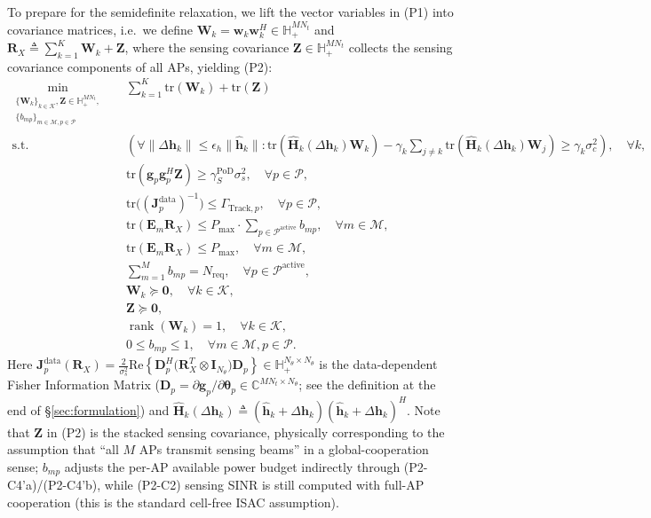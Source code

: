 \documentclass[12pt,a4paper]{article}
\newcommand{\vect}[1]{\mathbf{#1}}
\newcommand{\mat}[1]{\mathbf{#1}}
\newcommand{\tr}{\text{tr}}
\newcommand{\Real}{\text{Re}}
\DeclareMathOperator{\rank}{rank}
\begin{document}
To prepare for the semidefinite relaxation, we lift the vector variables in (P1) into covariance matrices, i.e.\ we define $\mat{W}_k = \vect{w}_k \vect{w}_k^H \in \mathbb{H}_+^{MN_t}$ and $\mat{R}_X \triangleq \sum_{k=1}^K \mat{W}_k + \mat{Z}$, where the sensing covariance $\mat{Z} \in \mathbb{H}_+^{MN_t}$ collects the sensing covariance components of all APs, yielding (P2):
\begin{align}
\min_{\substack{\{\mat{W}_k\}_{k\in\mathcal{K}}, \mat{Z} \in \mathbb{H}_+^{MN_t}, \\ \{b_{mp}\}_{m\in\mathcal{M},p\in\mathcal{P}}}} \quad
& \sum_{k=1}^K \tr(\mat{W}_k) + \tr(\mat{Z}) \tag{P2} \\
\text{s.t.} \quad
& (\forall \|\Delta\vect{h}_k\| \leq \epsilon_h \|\hat{\vect{h}}_k\|: \tr(\hat{\mat{H}}_k(\Delta\vect{h}_k) \mat{W}_k) - \gamma_k \sum_{j \neq k} \tr(\hat{\mat{H}}_k(\Delta\vect{h}_k) \mat{W}_j) \geq \gamma_k \sigma_c^2), \quad \forall k, \tag{P2-C1} \\
& \tr(\vect{g}_p \vect{g}_p^H \mat{Z}) \geq \gamma_S^{\text{PoD}} \sigma_s^2, \quad \forall p \in \mathcal{P}, \tag{P2-C2} \\
& \tr\big((\mat{J}_p^{\text{data}})^{-1}\big) \leq \Gamma_{\text{Track},p}, \quad \forall p \in \mathcal{P}, \tag{P2-C3} \label{eq:p2c3} \\
& \tr(\mat{E}_m \mat{R}_X) \leq P_{\max} \cdot \sum_{p \in \mathcal{P}^{\text{active}}} b_{mp}, \quad \forall m \in \mathcal{M}, \tag{P2-C4'a} \\
& \tr(\mat{E}_m \mat{R}_X) \leq P_{\max}, \quad \forall m \in \mathcal{M}, \tag{P2-C4'b} \\
& \sum_{m=1}^{M} b_{mp} = N_{\text{req}}, \quad \forall p \in \mathcal{P}^{\text{active}}, \tag{P2-C5'} \\
& \mat{W}_k \succeq \mat{0}, \quad \forall k \in \mathcal{K}, \tag{P2-C5} \\
& \mat{Z} \succeq \mat{0}, \tag{P2-C6} \\
& \rank(\mat{W}_k) = 1, \quad \forall k \in \mathcal{K}, \tag{P2-C7} \\
& 0 \leq b_{mp} \leq 1, \quad \forall m \in \mathcal{M}, p \in \mathcal{P}. \tag{P2-C8'}
\end{align}
Here $\mat{J}_p^{\text{data}}(\mat{R}_X) = \frac{2}{\sigma_s^2} \Real\!\left\{ \mat{D}_p^H \big( \mat{R}_X^T \otimes \mat{I}_{N_\theta} \big) \mat{D}_p \right\} \in \mathbb{H}_+^{N_\theta \times N_\theta}$ is the data-dependent Fisher Information Matrix ($\mat{D}_p = \partial \vect{g}_p / \partial \boldsymbol{\theta}_p \in \mathbb{C}^{MN_t \times N_\theta}$; see the definition at the end of \S\ref{sec:formulation}) and $\hat{\mat{H}}_k(\Delta\vect{h}_k) \triangleq (\hat{\vect{h}}_k + \Delta\vect{h}_k)(\hat{\vect{h}}_k + \Delta\vect{h}_k)^H$. Note that $\mat{Z}$ in (P2) is the stacked sensing covariance, physically corresponding to the assumption that ``all $M$ APs transmit sensing beams'' in a global-cooperation sense; $b_{mp}$ adjusts the per-AP available power budget indirectly through (P2-C4'a)/(P2-C4'b), while (P2-C2) sensing SINR is still computed with full-AP cooperation (this is the standard cell-free ISAC assumption).
\end{document}

